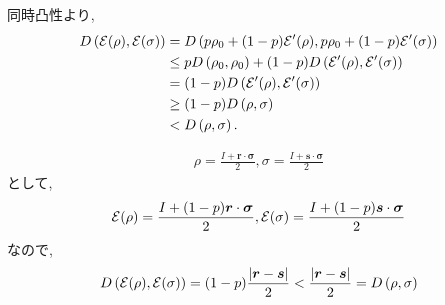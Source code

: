 \begin{ex}
    \label{ex9.11}
    同時凸性より,
    \begin{align*}
        D \left( \mathcal{E}(\rho), \mathcal{E}(\sigma)\right)
         & =
        D\left( p \rho_0 + (1-p)\mathcal{E}'(\rho), p \rho_0 + (1-p)\mathcal{E}'(\sigma) \right)
        \\
         & \leq
        p D \left( \rho_0, \rho_0\right)
        +
        (1-p) D \left( \mathcal{E}'(\rho), \mathcal{E}'(\sigma)\right)
        \\
         & =
        (1-p) D \left( \mathcal{E}'(\rho), \mathcal{E}'(\sigma)\right)
        \\
         & \geq(1-p)D\left( \rho, \sigma\right)
        \\
         & < D \left( \rho, \sigma\right).
    \end{align*}
\end{ex}

\begin{ex}
    \label{ex9.12}
    \begin{align*}
        \rho = \frac{I + \bm{r} \cdot \bm{\sigma}}{2},
        \sigma = \frac{I + \bm{s} \cdot \bm{\sigma}}{2}
    \end{align*}
    として,
    \begin{align*}
        \mathcal{E}(\rho)
        =
        \frac{I + (1-p)\bm{r}\cdot\bm{\sigma}}{2},
        \mathcal{E}(\sigma)
        =
        \frac{I + (1-p)\bm{s}\cdot\bm{\sigma}}{2}
    \end{align*}
    なので,
    \begin{align*}
        D \left( \mathcal{E}(\rho), \mathcal{E}(\sigma)\right)
        = (1-p)\frac{\left| \bm{r}- \bm{s} \right|}{2}
        <\frac{\left| \bm{r}- \bm{s} \right|}{2}
        = D \left( \rho, \sigma\right)
    \end{align*}
\end{ex}

